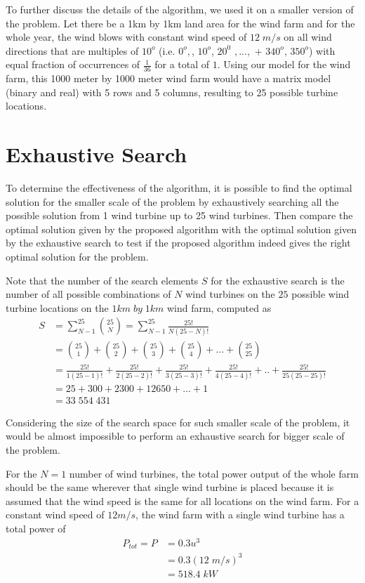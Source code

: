 To further discuss the details of the algorithm, we used it on a smaller version of the problem. Let there be a 1km by 1km land area for the wind farm and for the whole year, the wind blows with constant wind speed of $12\;m/s$ on all wind directions that are multiples of $10^o$ (i.e. $0^o,$, $10^o$, $20^0$ $,...,$ + $340^o$, $350^o$) with equal fraction of occurrences of $\frac{1}{36}$ for a total of $1$. Using our model for the wind farm, this 1000 meter by 1000 meter wind farm would have a matrix model (binary and real) with 5 rows and 5 columns, resulting to 25 possible turbine locations.

    
	\section{Exhaustive Search}
    To determine the effectiveness of the algorithm, it is possible to find the optimal solution for the smaller scale of the problem by exhaustively searching all the possible solution from 1 wind turbine up to 25 wind turbines. Then compare the optimal solution given by the proposed algorithm with the optimal solution given by the exhaustive search to test if the proposed algorithm indeed gives the right optimal solution for the problem.
    
    Note that the number of the search elements $S$ for the exhaustive search is the number of all possible combinations of $N$ wind turbines on the $25$ possible wind turbine locations on the $1km\;by\;1km$ wind farm, computed as
    \begin{align*}
        S
        &= \sum_{N-1}^{25}\binom{25}{N} = \sum_{N-1}^{25}\frac{25!}{N(25-N)!} \\
        &= \binom{25}{1} + \binom{25}{2} + \binom{25}{3} + \binom{25}{4} +...+ \binom{25}{25} \\
        &= \frac{25!}{1(25-1)!} + \frac{25!}{2(25-2)!} + \frac{25!}{3(25-3)!} + \frac{25!}{4(25-4)!} +..+ \frac{25!}{25(25-25)!} \\
        &= 25+300+2300+12650+...+1 \\
        &= 33\;554\;431
    \end{align*}
    
    Considering the size of the search space for such smaller scale of the problem, it would be almost impossible to perform an exhaustive search for bigger scale of the problem.
    
    For the $N=1$ number of wind turbines, the total power output of the whole farm should be the same wherever that single wind turbine is placed because it is assumed that the wind speed is the same for all locations on the wind farm. For a constant wind speed of $12m/s$, the wind farm with a single wind turbine has a total power of
        \begin{align*}
            P_{tot}=P
            &= 0.3u^3 \\
            &= 0.3(12\;m/s)^3\\
            &= 518.4 \;kW
        \end{align*}
        
